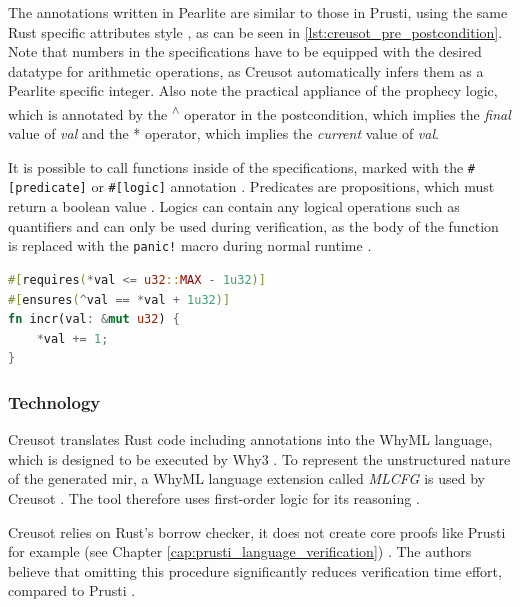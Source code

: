 The annotations written in Pearlite are similar to those in Prusti, using the same Rust specific attributes style \cite{rust_foundation_attributes_nodate}, as can be seen in \autoref{lst:creusot_pre_postcondition}. Note that numbers in the specifications have to be equipped with the desired datatype for arithmetic operations, as Creusot automatically infers them as a Pearlite specific integer. Also note the practical appliance of the prophecy logic, which is annotated by the \textsuperscript{$\wedge$} operator in the postcondition, which implies the \textit{final} \cite{riesco_creusot_2022} value of \textit{val} and the * operator, which implies the \textit{current} \cite{riesco_creusot_2022} value of \textit{val}.

It is possible to call functions inside of the specifications, marked with the \lstinline{#[predicate]} or \lstinline{#[logic]} annotation \cite{riesco_creusot_2022}. Predicates are propositions, which must return a boolean value \cite{xavier_denis_xldeniscreusot_2023}. Logics can contain any logical operations such as quantifiers and can only be used during verification, as the body of the function is replaced with the \lstinline{panic!} macro during normal runtime \cite{xavier_denis_xldeniscreusot_2023}.

\begin{lstlisting}[float, language=Rust, caption=Example Rust code of an increase function with a pre- and postcondition for Creusot, label={lst:creusot_pre_postcondition}]
#[requires(*val <= u32::MAX - 1u32)]
#[ensures(^val == *val + 1u32)]
fn incr(val: &mut u32) {
    *val += 1;
}
\end{lstlisting}

\subsubsection{Technology}
\label{cap:creusot_technology}
Creusot translates Rust code including annotations into the WhyML language, which is designed to be executed by Why3 \cite{riesco_creusot_2022}. To represent the unstructured nature of the generated \acs{mir}, a WhyML language extension called \textit{MLCFG} is used by Creusot \cite{riesco_creusot_2022,the_why3_development_team_7_2023}. The tool therefore uses first-order logic for its reasoning \cite{riesco_creusot_2022}.

Creusot relies on Rust's borrow checker, it does not create core proofs like Prusti for example (see Chapter \ref{cap:prusti_language_verification}) \cite{riesco_creusot_2022}. The authors believe that omitting this procedure significantly reduces verification time effort, compared to Prusti \cite{riesco_creusot_2022}. 

